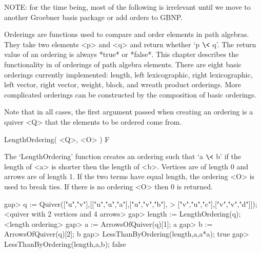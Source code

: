 %
%
%


NOTE: for the time being, most of the following is irrelevant until we
move to another Groebner basis package or add orders to GBNP.

Orderings are functions used to compare and order elements in path algebras.
They take two elements <p> and <q> and return whether `p $\<$ q'.  The return
value of an ordering is always *true* or *false*.  This chapter describes
the functionality in {\QPA} of orderings of path algebra elements.  There
are eight basic orderings currently implemented: length, left lexicographic,
right lexicographic, left vector, right vector, weight, block, and wreath
product orderings.  More complicated orderings can be constructed by the
composition of basic orderings.


Note that in all cases, the first argument passed when creating an ordering
is a quiver <Q> that the elements to be ordered come from.

\>LengthOrdering( <Q>, <O> ) F

The `LengthOrdering' function creates an ordering such that `a $\<$ b' if
the length of <a> is shorter then the length of <b>.  Vertices are of length
0 and arrows are of length 1.  If the two terms have equal length, the
ordering <O> is used to break ties.  If there is no ordering <O> then 0 is
returned.

\beginexample
gap> q := Quiver(["u","v"],[["u","u","a"],["u","v","b"],
> ["v","u","c"],["v","v","d"]]);
<quiver with 2 vertices and 4 arrows>
gap> length := LengthOrdering(q);
<length ordering>
gap> a := ArrowsOfQuiver(q)[1];
a
gap> b := ArrowsOfQuiver(q)[2];
b
gap> LessThanByOrdering(length,a,a*a);
true
gap> LessThanByOrdering(length,a,b);
false
\endexample

